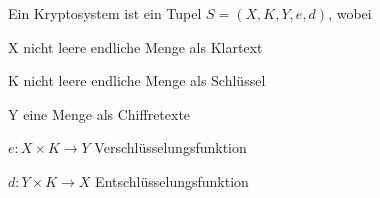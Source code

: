 \documentclass[avery5371, frame]{flashcards}
\begin{document}

\begin{flashcard}[Kryptosysteme]{Ein Kryptosystem ist ein Tupel $S=(X,K,Y,e,d)$, wobei}
    \begin{itemize*}
      \item X nicht leere endliche Menge als Klartext
      \item K nicht leere endliche Menge als Schlüssel
      \item Y eine Menge als Chiffretexte
      \item $e:X\times K\rightarrow Y$ Verschlüsselungsfunktion
      \item $d:Y\times K\rightarrow X$ Entschlüsselungsfunktion
    \end{itemize*}
\end{flashcard}
\end{document}
